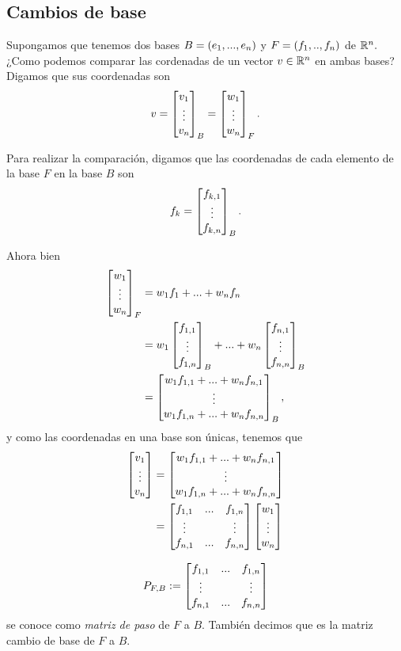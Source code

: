 \subsection*{Cambios de base}

Supongamos que tenemos dos bases $B=\left( e_{1},...,e_{n} \right)$ y $F=\left( f_{1},..,f_{n} \right)$ de $\mathbb{R}^{n}.$ ¿Como podemos
comparar las cordenadas de un vector $v\in \mathbb{R}^{n}$ en ambas bases? Digamos que sus coordenadas son
$$
v=\begin{bmatrix}v_{1}\\ \vdots \\ v_{n}\end{bmatrix}_{B} = \begin{bmatrix}w_{1} \\ \vdots \\ w_{n}\end{bmatrix}_{F}.
$$

Para realizar la comparación, digamos que
las coordenadas de cada elemento de la base $F$ en la base $B$ son
$$
f_{k}=\begin{bmatrix}f_{k,1}\\ \vdots \\ f_{k,n}\end{bmatrix}_{B}.
$$

Ahora bien
\begin{align*}
 \begin{bmatrix}w_{1} \\ \vdots \\ w_{n}\end{bmatrix}_{F}
 &=w_{1}f_{1}+...+w_{n}f_{n} \\
 &=w_{1}\begin{bmatrix}f_{1,1}\\ \vdots \\ f_{1,n}\end{bmatrix}_{B}+...+w_{n}\begin{bmatrix}f_{n,1}\\ \vdots \\ f_{n,n}\end{bmatrix}_{B} \\
 &=\begin{bmatrix}w_{1}f_{1,1}+...+w_{n}f_{n,1}\\  \vdots \\
w_{1}f_{1,n}+...+w_{n}f_{n,n} \end{bmatrix}_{B},
\end{align*}
y como las coordenadas en una base son únicas, tenemos que
\begin{align*}
 \begin{bmatrix}v_{1}\\ \vdots \\ v_{n}\end{bmatrix} & = \begin{bmatrix}w_{1}f_{1,1}+...+w_{n}f_{n,1}\\  \vdots \\
w_{1}f_{1,n}+...+w_{n}f_{n,n} \end{bmatrix} \\
&= \begin{bmatrix}f_{1,1} & ... & f_{1,n} \\ \vdots & & \vdots \\ f_{n,1} & ... & f_{n,n}\end{bmatrix} \begin{bmatrix}w_{1} \\ \vdots \\ w_{n}\end{bmatrix}
\end{align*}

\begin{definicion}
 $$P_{F,B}:=\begin{bmatrix}f_{1,1} & ... & f_{1,n} \\ \vdots & & \vdots \\ f_{n,1} & ... & f_{n,n}\end{bmatrix}$$ se conoce como \emph{matriz
de paso} de $F$ a $B$. También decimos que es la matriz cambio de base de $F$ a $B$.
\end{definicion}

